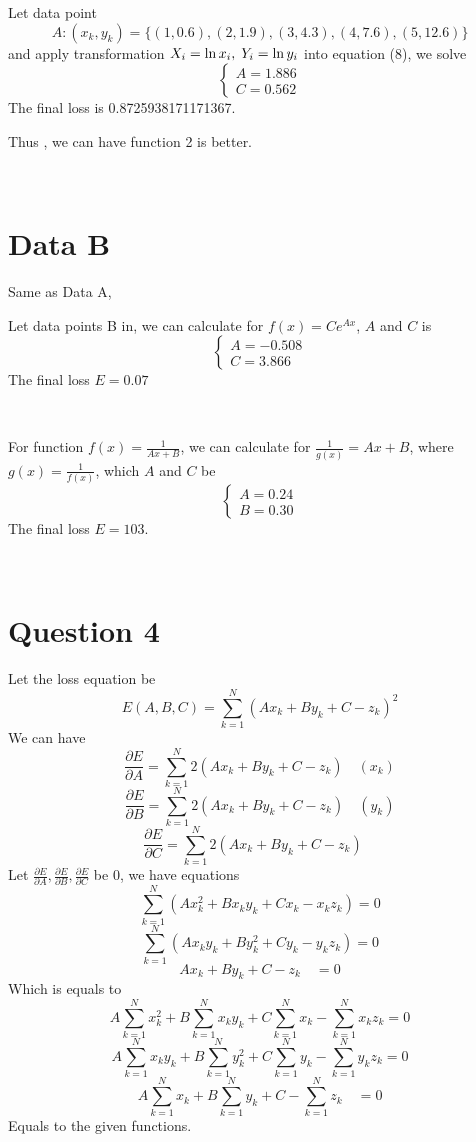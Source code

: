 \documentclass{article}
\newcommand{\tmxspace}{\hspace{1em}}
{\theorembodyfont{\rmfamily}\newtheorem{answer}{Answer}}
\begin{document}
{{Let data point
\[ A : (x_k, y_k) = \{(1, 0.6), (2, 1.9), (3, 4.3), (4, 7.6), (5, 12.6)\} \]
and apply transformation $X_i = \ln x_i, \hspace{0.27em} Y_i = \ln y_i$ into
equation (8), we solve
\[ \left\{\begin{array}{l}
     A = 1.886\\
     C = 0.562
   \end{array}\right. \]
The final loss is 0.8725938171171367.

Thus , we can have function 2 is better.

\

\section*{Data B}

Same as Data A,

Let data points B in, we can calculate for $f (x) = C e^{A x}$, $A$ and $C$
is
\[ \left\{\begin{array}{l}
     A = - 0.508\\
     C = 3.866
   \end{array}\right. \]
The final loss $E = 0.07$

\

For function $f (x) = \frac{1}{A x + B}$, we can calculate for $\frac{1}{g
(x)} = A x + B$, where $g (x) = \frac{1}{f (x)}$, which $A$ and $C$ be
\[ \left\{\begin{array}{l}
     A = 0.24\\
     B = 0.30
   \end{array}\right. \]
The final loss $E = 103$.

\

\section*{Question 4}

Let the loss equation be
\[ E (A, B, C) = \sum_{k = 1}^N (A x_k + B y_k + C - z_k)^2 \]
We can have
\[ \frac{\partial E}{\partial A} = \sum_{k = 1}^N 2 (A x_k + B y_k + C - z_k)
   \tmxspace (x_k) \]
\[ \frac{\partial E}{\partial B} = \sum_{k = 1}^N 2 (A x_k + B y_k + C - z_k)
   \tmxspace (y_k) \]
\[ \frac{\partial E}{\partial C} = \sum_{k = 1}^N 2 (A x_k + B y_k + C - z_k)
   \tmxspace \]
Let $\frac{\partial E}{\partial A}, \frac{\partial E}{\partial B},
\frac{\partial E}{\partial C}$ be 0, we have equations
\[ \sum_{k = 1}^N (A x^2_k + B x_k y_k + C x_k - x_k z_k) = 0 \]
\[ \sum_{k = 1}^N (A x_k y_k + B y_k^2 + C y_k - y_k z_k) = 0 \]
\[ A x_k + B y_k + C - z_k \tmxspace = 0 \]
Which is equals to
\[ A \sum_{k = 1}^N x^2_k + B \sum_{k = 1}^N x_k y_k + C \sum_{k = 1}^N x_k -
   \sum_{k = 1}^N x_k z_k = 0 \]
\[ A \sum_{k = 1}^N x_k y_k + B \sum_{k = 1}^N y_k^2 + C \sum_{k = 1}^N y_k -
   \sum_{k = 1}^N y_k z_k = 0 \]
\[ A \sum_{k = 1}^N x_k + B \sum_{k = 1}^N y_k + C - \sum_{k = 1}^N z_k
   \tmxspace = 0 \]
Equals to the given functions.

}}
\end{document}
